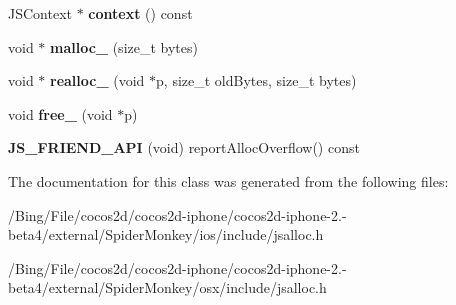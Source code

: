 \begin{DoxyCompactItemize}
\item 
\hypertarget{classjs_1_1_temp_alloc_policy_a9bbea079978c541aaf2ade7eece363af}{J\-S\-Context $\ast$ {\bfseries context} () const }\label{classjs_1_1_temp_alloc_policy_a9bbea079978c541aaf2ade7eece363af}

\item 
\hypertarget{classjs_1_1_temp_alloc_policy_abb57d5d7c2f5381be7fefe591d72915b}{void $\ast$ {\bfseries malloc\-\_\-} (size\-\_\-t bytes)}\label{classjs_1_1_temp_alloc_policy_abb57d5d7c2f5381be7fefe591d72915b}

\item 
\hypertarget{classjs_1_1_temp_alloc_policy_ab2ffd5a8a399c4612c4dd43640a407d1}{void $\ast$ {\bfseries realloc\-\_\-} (void $\ast$p, size\-\_\-t old\-Bytes, size\-\_\-t bytes)}\label{classjs_1_1_temp_alloc_policy_ab2ffd5a8a399c4612c4dd43640a407d1}

\item 
\hypertarget{classjs_1_1_temp_alloc_policy_a7a8a1198f28fb2e7294f010ed51be0a9}{void {\bfseries free\-\_\-} (void $\ast$p)}\label{classjs_1_1_temp_alloc_policy_a7a8a1198f28fb2e7294f010ed51be0a9}

\item 
\hypertarget{classjs_1_1_temp_alloc_policy_a3ebc04ae8de613e349ae687914318a5c}{{\bfseries J\-S\-\_\-\-F\-R\-I\-E\-N\-D\-\_\-\-A\-P\-I} (void) report\-Alloc\-Overflow() const }\label{classjs_1_1_temp_alloc_policy_a3ebc04ae8de613e349ae687914318a5c}

\end{DoxyCompactItemize}


The documentation for this class was generated from the following files\-:\begin{DoxyCompactItemize}
\item 
/\-Bing/\-File/cocos2d/cocos2d-\/iphone/cocos2d-\/iphone-\/2.-\/beta4/external/\-Spider\-Monkey/ios/include/jsalloc.\-h\item 
/\-Bing/\-File/cocos2d/cocos2d-\/iphone/cocos2d-\/iphone-\/2.-\/beta4/external/\-Spider\-Monkey/osx/include/jsalloc.\-h\end{DoxyCompactItemize}
